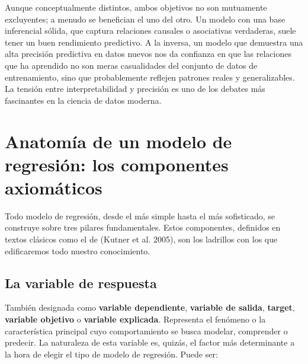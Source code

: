 \documentclass[
  letterpaper,
  DIV=11,
  numbers=noendperiod]{scrreprt}
\begin{document}
\begin{tcolorbox}[enhanced jigsaw, leftrule=.75mm, breakable, colbacktitle=quarto-callout-important-color!10!white, bottomrule=.15mm, colframe=quarto-callout-important-color-frame, toprule=.15mm, colback=white, coltitle=black, bottomtitle=1mm, left=2mm, title=\textcolor{quarto-callout-important-color}{\faExclamation}\hspace{0.5em}{Una relación simbiótica}, opacityback=0, arc=.35mm, opacitybacktitle=0.6, toptitle=1mm, titlerule=0mm, rightrule=.15mm]

Aunque conceptualmente distintos, ambos objetivos no son mutuamente
excluyentes; a menudo se benefician el uno del otro. Un modelo con una
base inferencial sólida, que captura relaciones causales o asociativas
verdaderas, suele tener un buen rendimiento predictivo. A la inversa, un
modelo que demuestra una alta precisión predictiva en datos nuevos nos
da confianza en que las relaciones que ha aprendido no son meras
casualidades del conjunto de datos de entrenamiento, sino que
probablemente reflejen patrones reales y generalizables. La tensión
entre interpretabilidad y precisión es uno de los debates más
fascinantes en la ciencia de datos moderna.

\end{tcolorbox}

\section{Anatomía de un modelo de regresión: los componentes
axiomáticos}\label{sec-componentes}

Todo modelo de regresión, desde el más simple hasta el más sofisticado,
se construye sobre tres pilares fundamentales. Estos componentes,
definidos en textos clásicos como el de (Kutner et al. 2005), son los
ladrillos con los que edificaremos todo nuestro conocimiento.

\subsection{La variable de respuesta}\label{la-variable-de-respuesta}

También designada como \textbf{variable dependiente}, \textbf{variable
de salida}, \textbf{target}, \textbf{variable objetivo} o
\textbf{variable explicada}. Representa el fenómeno o la característica
principal cuyo comportamiento se busca modelar, comprender o predecir.
La naturaleza de esta variable es, quizás, el factor más determinante a
la hora de elegir el tipo de modelo de regresión. Puede ser:
\end{document}
